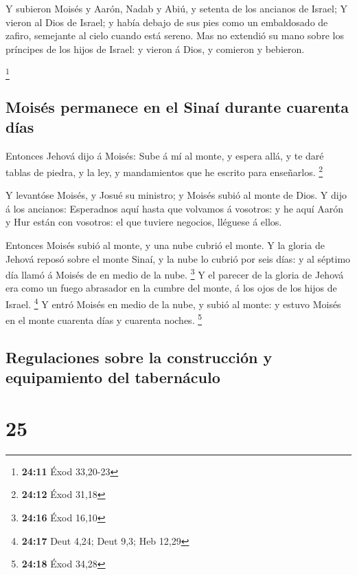  Y subieron Moisés y Aarón, Nadab y Abiú, y setenta de los
ancianos de Israel;  Y vieron al Dios de Israel; y había
debajo de sus pies como un embaldosado de zafiro, semejante al cielo
cuando está sereno.  Mas no extendió su mano sobre los
príncipes de los hijos de Israel: y vieron á Dios, y comieron y
bebieron.

\footnote{\textbf{24:11} Éxod 33,20-23}

\hypertarget{moisuxe9s-permanece-en-el-sinauxed-durante-cuarenta-duxedas}{%
\subsection{Moisés permanece en el Sinaí durante cuarenta
días}\label{moisuxe9s-permanece-en-el-sinauxed-durante-cuarenta-duxedas}}

 Entonces Jehová dijo á Moisés: Sube á mí al monte, y
espera allá, y te daré tablas de piedra, y la ley, y mandamientos que he
escrito para enseñarlos. \footnote{\textbf{24:12} Éxod 31,18}

 Y levantóse Moisés, y Josué su ministro; y Moisés subió al
monte de Dios.  Y dijo á los ancianos: Esperadnos aquí
hasta que volvamos á vosotros: y he aquí Aarón y Hur están con vosotros:
el que tuviere negocios, lléguese á ellos.

 Entonces Moisés subió al monte, y una nube cubrió el
monte.  Y la gloria de Jehová reposó sobre el monte Sinaí,
y la nube lo cubrió por seis días: y al séptimo día llamó á Moisés de en
medio de la nube. \footnote{\textbf{24:16} Éxod 16,10}  Y
el parecer de la gloria de Jehová era como un fuego abrasador en la
cumbre del monte, á los ojos de los hijos de Israel. \footnote{\textbf{24:17}
  Deut 4,24; Deut 9,3; Heb 12,29}  Y entró Moisés en medio
de la nube, y subió al monte: y estuvo Moisés en el monte cuarenta días
y cuarenta noches. \footnote{\textbf{24:18} Éxod 34,28}

\hypertarget{regulaciones-sobre-la-construcciuxf3n-y-equipamiento-del-tabernuxe1culo}{%
\subsection{Regulaciones sobre la construcción y equipamiento del
tabernáculo}\label{regulaciones-sobre-la-construcciuxf3n-y-equipamiento-del-tabernuxe1culo}}

\hypertarget{section-24}{%
\section{25}\label{section-24}}

